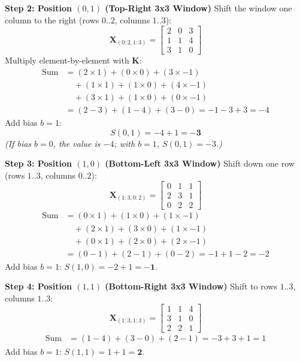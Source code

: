 \begin{example}
\textbf{Step 2: Position $(0, 1)$ (Top-Right 3x3 Window)}
Shift the window one column to the right (rows $0..2$, columns $1..3$):
\begin{equation*}
\mathbf{X}_{(0:2, 1:3)} = \begin{bmatrix}
2 & 0 & 3 \\
1 & 1 & 4 \\
3 & 1 & 0
\end{bmatrix}
\end{equation*}
Multiply element-by-element with $\mathbf{K}$:
\begin{align*}
\text{Sum} &= (2 \times 1) + (0 \times 0) + (3 \times -1) \\
           &\quad + (1 \times 1) + (1 \times 0) + (4 \times -1) \\
           &\quad + (3 \times 1) + (1 \times 0) + (0 \times -1) \\
           &= (2 - 3) + (1 - 4) + (3 - 0) = -1 - 3 + 3 = -4
\end{align*}
Add bias $b = 1$:
\begin{equation*}
S(0, 1) = -4 + 1 = \mathbf{-3}
\end{equation*}
\textit{(If bias $b=0$, the value is $-4$; with $b=1$, $S(0,1) = -3$.)}

\textbf{Step 3: Position $(1, 0)$ (Bottom-Left 3x3 Window)}
Shift down one row (rows $1..3$, columns $0..2$):
\begin{equation*}
\mathbf{X}_{(1:3, 0:2)} = \begin{bmatrix}
0 & 1 & 1 \\
2 & 3 & 1 \\
0 & 2 & 2
\end{bmatrix}
\end{equation*}
\begin{align*}
\text{Sum} &= (0 \times 1) + (1 \times 0) + (1 \times -1) \\
           &\quad + (2 \times 1) + (3 \times 0) + (1 \times -1) \\
           &\quad + (0 \times 1) + (2 \times 0) + (2 \times -1) \\
           &= (0 - 1) + (2 - 1) + (0 - 2) = -1 + 1 - 2 = -2
\end{align*}
Add bias $b = 1$: $S(1, 0) = -2 + 1 = \mathbf{-1}$.

\textbf{Step 4: Position $(1, 1)$ (Bottom-Right 3x3 Window)}
Shift to rows $1..3$, columns $1..3$:
\begin{equation*}
\mathbf{X}_{(1:3, 1:3)} = \begin{bmatrix}
1 & 1 & 4 \\
3 & 1 & 0 \\
2 & 2 & 1
\end{bmatrix}
\end{equation*}
\begin{align*}
\text{Sum} &= (1 - 4) + (3 - 0) + (2 - 1) = -3 + 3 + 1 = 1
\end{align*}
Add bias $b = 1$: $S(1, 1) = 1 + 1 = \mathbf{2}$.
\end{example}

